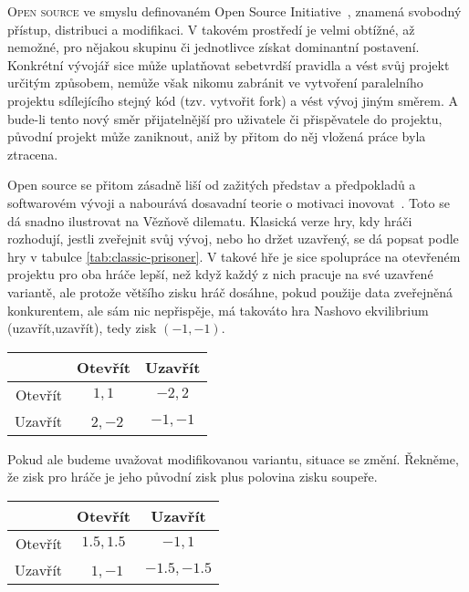 \begin{multicols}{2}
\lettrine[nindent=0em,lines=3]{O}{pen source} ve smyslu definovaném Open Source Initiative~\cite{OSI-2011}, znamená svobodný přístup, distribuci a modifikaci. V takovém prostředí je velmi obtížné, až nemožné, pro nějakou skupinu či jednotlivce získat dominantní postavení. Konkrétní vývojář sice může uplatňovat sebetvrdší pravidla a vést svůj projekt určitým způsobem, nemůže však nikomu zabránit ve vytvoření paralelního projektu sdílejícího stejný kód (tzv. vytvořit fork) a vést vývoj jiným směrem. A bude-li tento nový směr přijatelnější pro uživatele či přispěvatele do projektu, původní projekt může zaniknout, aniž by přitom do něj vložená práce byla ztracena.

Open source se přitom zásadně liší od zažitých představ a předpokladů a softwarovém vývoji a nabourává dosavadní teorie o motivaci inovovat~\cite{promise-of-research-opensource}. Toto se dá snadno ilustrovat na Vězňově dilematu. Klasická verze hry, kdy hráči rozhodují, jestli zveřejnit svůj vývoj, nebo ho držet uzavřený, se dá popsat podle hry v tabulce \ref{tab:classic-prisoner}. V takové hře je sice spolupráce na otevřeném projektu pro oba hráče lepší, než když každý z nich pracuje na své uzavřené variantě, ale protože většího zisku hráč dosáhne, pokud použije data zveřejněná konkurentem, ale sám nic nepřispěje, má takováto hra Nashovo ekvilibrium (uzavřít,uzavřít), tedy zisk $(-1,-1)$.

\begin{Figure}
\label{tab:classic-prisoner}
\begin{center}
\begin{tabular}{r| c c}
		& Otevřít & Uzavřít \\
		\hline
	Otevřít & $1,1$ & $-2,2$ \\
	Uzavřít & $2,-2$ & $-1,-1$ \\
\end{tabular}
\end{center}
\end{Figure}

Pokud ale budeme uvažovat modifikovanou variantu, situace se změní. Řekněme, že zisk pro hráče je jeho původní zisk plus polovina zisku soupeře.

\begin{Figure}
\label{tab:new-prisoner}
\begin{center}
\begin{tabular}{r| c c}
		& Otevřít & Uzavřít \\
		\hline
	Otevřít & $1.5,1.5$ & $-1,1$ \\
	Uzavřít & $1,-1$ & $-1.5,-1.5$ \\
\end{tabular}
\end{center}
\end{Figure}


\end{multicols}
